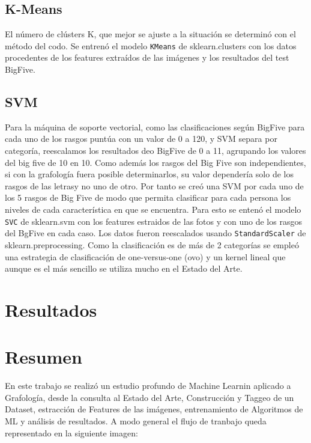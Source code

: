 \documentclass[10pt, a4paper]{article}
\begin{document}
        \subsection{K-Means}
            El n\'umero de cl\'usters K, que mejor se ajuste a la situaci\'on se determin\'o con el m\'etodo del codo. Se entren\'o el 
            modelo \texttt{KMeans} de sklearn.clusters con los datos procedentes de los features extra\'idos de las im\'agenes y los resultados del 
            test BigFive.
        
            \subsection{SVM}
            Para la m\'aquina de soporte vectorial, como las clasificaciones seg\'un BigFive para cada uno de los rasgos punt\'ua con un valor de 0 a 120, y SVM separa por categor\'ia,
            reescalamos los resultados deo BigFive de 0 a 11, agrupando los valores del big five de 10 en 10. Como adem\'as los rasgos del Big Five son independientes, si con la grafolog\'ia fuera posible determinarlos, su valor depender\'ia solo de los rasgos de las letrasy no uno de otro.
            Por tanto se cre\'o una SVM por cada uno de los 5 rasgos de Big Five de modo que permita clasificar para cada persona los niveles de cada caracter\'istica en que se encuentra. Para esto se enten\'o el modelo \texttt{SVC} de sklearn.svm con los features estraidos de las fotos y con uno de los rasgos del BgFive en cada caso.
            Los datos fueron reescalados usando \texttt{StandardScaler} de sklearn.preprocessing.
            Como la clasificaci\'on es de m\'as de 2 categor\'ias se emple\'o una estrategia de clasificaci\'on de one-versus-one (ovo) y un kernel lineal que aunque es el m\'as sencillo se utiliza mucho en el Estado del Arte.

    \section{Resultados}

    \section{Resumen}
        En este trabajo se realiz\'o un estudio profundo de Machine Learnin aplicado a Grafolog\'ia, desde la consulta al Estado del Arte, Construcci\'on y Taggeo de 
        un Dataset, estracci\'on de Features de las im\'agenes, entrenamiento de Algoritmos de ML y an\'alisis de resultados. A modo general el flujo de tranbajo queda representado 
        en la siguiente imagen: 
\end{document}

